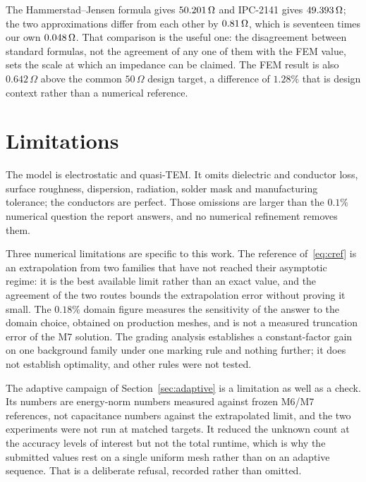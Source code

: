 \documentclass[11pt]{article}
\begin{document}
\begin{table}[H]
\centering
\small
\caption{Engineering benchmark comparison. The primary $d_{\rm HJ}$ column uses the
Hammerstad--Jensen value in the denominator, as specified; the last column is the
supplementary difference normalised by the FEM value and is not $d_{\rm HJ}$.}
\label{tab:bench}

\end{table}

The Hammerstad--Jensen formula gives $50.201\,\Omega$ and IPC-2141 gives $49.393\,\Omega$; the
two approximations differ from each other by $0.81\,\Omega$, which is seventeen times
our own $0.048\,\Omega$. That comparison is the useful one: the disagreement between
standard formulas, not the agreement of any one of them with the FEM value, sets the scale
at which an impedance can be claimed. The FEM result is also $0.642\,\Omega$ above the
common $50\,\Omega$ design target, a difference of $1.28\%$ that is design context rather
than a numerical reference.

\section{Limitations}
The model is electrostatic and quasi-TEM. It omits dielectric and conductor loss, surface
roughness, dispersion, radiation, solder mask and manufacturing tolerance; the conductors
are perfect. Those omissions are larger than the $0.1\%$ numerical question the report
answers, and no numerical refinement removes them.

Three numerical limitations are specific to this work. The reference of~\eqref{eq:cref} is an
extrapolation from two families that have not reached their asymptotic regime: it is the best
available limit rather than an exact value, and the agreement of the two routes bounds the
extrapolation error without proving it small. The $0.18\%$ domain figure measures the
sensitivity of the answer to the domain choice, obtained on production meshes, and is not a
measured truncation error of the M7 solution. The grading analysis establishes a
constant-factor gain on one background family under one marking rule and nothing further; it
does not establish optimality, and other rules were not tested.

The adaptive campaign of Section~\ref{sec:adaptive} is a limitation as well as a check. Its
numbers are energy-norm numbers measured against frozen M6/M7 references, not capacitance
numbers against the extrapolated limit, and the two experiments were not run at matched
targets. It reduced the unknown count at the accuracy levels of interest but not the total
runtime, which is why the submitted values rest on a single uniform mesh rather than on an
adaptive sequence. That is a deliberate refusal, recorded rather than omitted.
\end{document}
